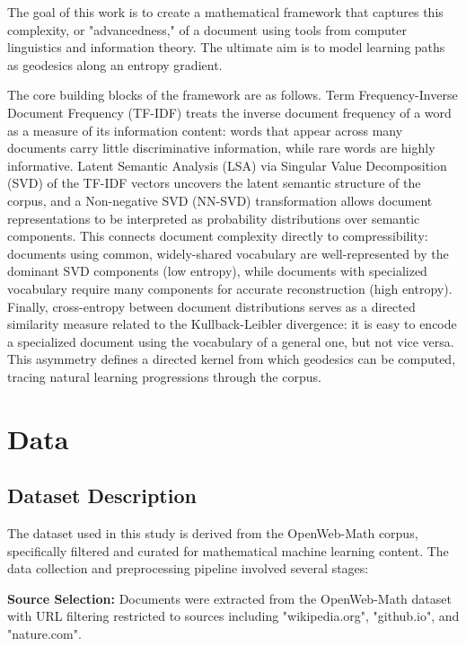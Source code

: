 \documentclass[12pt,a4paper]{article}
\begin{document}
The goal of this work is to create a mathematical framework that captures this complexity, or "advancedness," of a document using tools from computer linguistics and information theory. The ultimate aim is to model learning paths as geodesics along an entropy gradient.

The core building blocks of the framework are as follows. Term Frequency-Inverse Document Frequency (TF-IDF) \cite{salton1988term} treats the inverse document frequency of a word as a measure of its information content: words that appear across many documents carry little discriminative information, while rare words are highly informative. Latent Semantic Analysis (LSA) \cite{deerwester1990indexing} via Singular Value Decomposition (SVD) of the TF-IDF vectors uncovers the latent semantic structure of the corpus, and a Non-negative SVD (NN-SVD) \cite{boutsidis2008svd} transformation allows document representations to be interpreted as probability distributions over semantic components. This connects document complexity directly to compressibility: documents using common, widely-shared vocabulary are well-represented by the dominant SVD components (low entropy), while documents with specialized vocabulary require many components for accurate reconstruction (high entropy). Finally, cross-entropy between document distributions serves as a directed similarity measure related to the Kullback-Leibler divergence: it is easy to encode a specialized document using the vocabulary of a general one, but not vice versa. This asymmetry defines a directed kernel from which geodesics can be computed, tracing natural learning progressions through the corpus.

\section{Data}

\subsection{Dataset Description}

The dataset used in this study is derived from the OpenWeb-Math \cite{grosset2021openwebmath} corpus, specifically filtered and curated for mathematical machine learning content. The data collection and preprocessing pipeline involved several stages:

\textbf{Source Selection:} Documents were extracted from the OpenWeb-Math dataset with URL filtering restricted to sources including "wikipedia.org", "github.io", and "nature.com".
\end{document}
